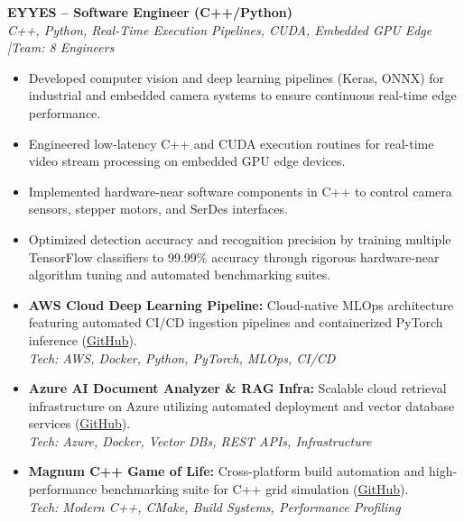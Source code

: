 \documentclass[10pt,a4paper]{article}
\begin{document}
\vspace{0.15cm}
\textbf{EYYES -- Software Engineer (C++/Python)} \\
\textit{C++, Python, Real-Time Execution Pipelines, CUDA, Embedded GPU Edge \quad|\quad Team: 8 Engineers}
\begin{itemize}
    \item Developed computer vision and deep learning pipelines (Keras, ONNX) for industrial and embedded camera systems to ensure continuous real-time edge performance.
    \item Engineered low-latency C++ and CUDA execution routines for real-time video stream processing on embedded GPU edge devices.
    \item Implemented hardware-near software components in C++ to control camera sensors, stepper motors, and SerDes interfaces.
    \item Optimized detection accuracy and recognition precision by training multiple TensorFlow classifiers to 99.99\% accuracy through rigorous hardware-near algorithm tuning and automated benchmarking suites.
\end{itemize}



\begin{itemize}[leftmargin=1.5em, itemsep=0.2em]
    \item \textbf{AWS Cloud Deep Learning Pipeline:} Cloud-native MLOps architecture featuring automated CI/CD ingestion pipelines and containerized PyTorch inference (\href{https://github.com/CodeByMaxx/aws-pneumonia-detection}{GitHub}).\\
    \textit{Tech: AWS, Docker, Python, PyTorch, MLOps, CI/CD}
    \item \textbf{Azure AI Document Analyzer \& RAG Infra:} Scalable cloud retrieval infrastructure on Azure utilizing automated deployment and vector database services (\href{https://github.com/CodeByMaxx/AI-Document-Analyzer}{GitHub}).\\
    \textit{Tech: Azure, Docker, Vector DBs, REST APIs, Infrastructure}
    \item \textbf{Magnum C++ Game of Life:} Cross-platform build automation and high-performance benchmarking suite for C++ grid simulation (\href{https://github.com/CodeByMaxx/magnum-game-of-life}{GitHub}).\\
    \textit{Tech: Modern C++, CMake, Build Systems, Performance Profiling}
\end{itemize}
\end{document}
